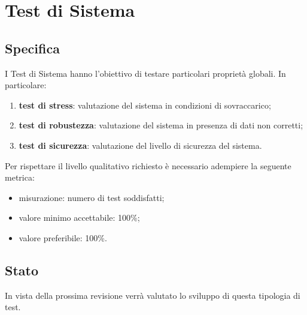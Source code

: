 \section{Test di Sistema}

	\subsection{Specifica}
		I Test di Sistema hanno l'obiettivo di testare particolari proprietà globali. In particolare:
		\begin{enumerate}
			\item{\textbf{test di stress}: valutazione del sistema in condizioni di sovraccarico;}
			\item{\textbf{test di robustezza}: valutazione del sistema in presenza di dati non corretti;}
			\item{\textbf{test di sicurezza}: valutazione del livello di sicurezza del sistema.}
		\end{enumerate}
		Per rispettare il livello qualitativo richiesto è necessario adempiere la seguente metrica:
		\begin{itemize}
			\item{misurazione: numero di test soddisfatti;}
			\item{valore minimo accettabile: 100\%;}
			\item{valore preferibile: 100\%.}
		\end{itemize}
	
	
	\subsection{Stato}
		In vista della prossima revisione verrà valutato lo sviluppo di questa tipologia di test.